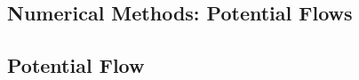 \documentclass[class=report, 12pt, crop=false]{standalone}
\begin{document}
\begin{center}
\chapter{Numerical Methods: Potential Flows}
\begin{comment}
Only for 2D , next time please expand to 3D!
\end{comment}
\section{Potential Flow}
\begin{comment}
\end{comment}

\end{center}
\end{document}
